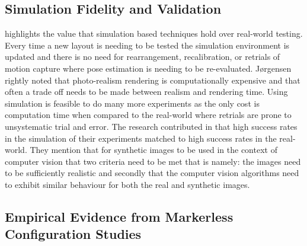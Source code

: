 \subsection{Simulation Fidelity and Validation}
\citet{jorgensen2018simulation} highlights the value that simulation based techniques hold over real-world testing. Every time a new layout is needing to be tested the simulation environment is updated and there is no need for rearrangement, recalibration, or retrials of motion capture where pose estimation is needing to be re-evaluated. Jørgensen rightly noted that photo-realism rendering is computationally expensive and that often a trade off needs to be made between realism and rendering time. Using simulation is feasible to do many more experiments as the only cost is computation time when compared to the real-world where retrials are prone to unsystematic trial and error. The research contributed in that high success rates in the simulation of their experiments matched to high success rates in the real-world. They mention that for synthetic images to be used in the context of computer vision that two criteria need to be met that is namely: the images need to be sufficiently realistic and secondly that the computer vision algorithms need to exhibit similar behaviour for both the real and synthetic images. 


\subsection{Empirical Evidence from Markerless Configuration Studies}
\cite{kwak2025assessing}
\cite{yang2025comparison}
\cite{nishikawa2025comparison}
\cite{kim2026comparison}
\cite{wren2023comparison}

